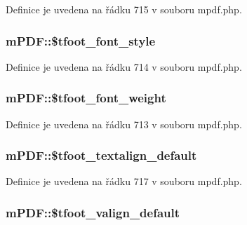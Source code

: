 Definice je uvedena na řádku 715 v souboru mpdf.\-php.

\hypertarget{classm_p_d_f_a398b1db342ce6031d20a3987a8479239}{
\subsubsection[{\$tfoot\-\_\-font\-\_\-style}]{\setlength{\rightskip}{0pt plus 5cm}m\-P\-D\-F\-::\$tfoot\-\_\-font\-\_\-style}}\label{classm_p_d_f_a398b1db342ce6031d20a3987a8479239}


Definice je uvedena na řádku 714 v souboru mpdf.\-php.

\hypertarget{classm_p_d_f_a223ec9b10bc4f523453f82c7cc2ccd31}{
\subsubsection[{\$tfoot\-\_\-font\-\_\-weight}]{\setlength{\rightskip}{0pt plus 5cm}m\-P\-D\-F\-::\$tfoot\-\_\-font\-\_\-weight}}\label{classm_p_d_f_a223ec9b10bc4f523453f82c7cc2ccd31}


Definice je uvedena na řádku 713 v souboru mpdf.\-php.

\hypertarget{classm_p_d_f_adeb6ac63358951b4ee1f5060d939bf07}{
\subsubsection[{\$tfoot\-\_\-textalign\-\_\-default}]{\setlength{\rightskip}{0pt plus 5cm}m\-P\-D\-F\-::\$tfoot\-\_\-textalign\-\_\-default}}\label{classm_p_d_f_adeb6ac63358951b4ee1f5060d939bf07}


Definice je uvedena na řádku 717 v souboru mpdf.\-php.

\hypertarget{classm_p_d_f_ab0d09240035a20463865802bf0bea5a5}{
\subsubsection[{\$tfoot\-\_\-valign\-\_\-default}]{\setlength{\rightskip}{0pt plus 5cm}m\-P\-D\-F\-::\$tfoot\-\_\-valign\-\_\-default}}\label{classm_p_d_f_ab0d09240035a20463865802bf0bea5a5}


